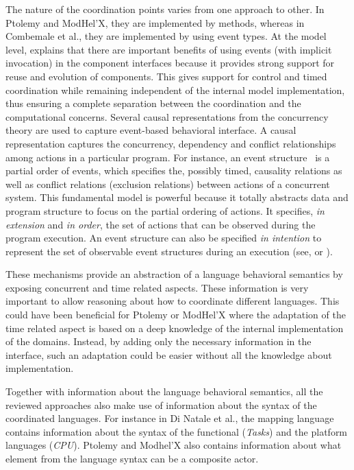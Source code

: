 {The nature of the coordination points varies from one approach to other. In Ptolemy and ModHel'X, they are implemented by methods, whereas in Combemale et al., they are implemented by using event types. At the model level, \cite{garlansoftarchbib} explains that there are important benefits of using events (with implicit invocation) in the component interfaces because it provides strong support for reuse and evolution of components. This gives support for control and timed coordination while remaining independent of the internal model implementation, thus ensuring a complete separation between the coordination and the computational concerns. Several causal representations from the concurrency theory are used to capture event-based behavioral interface. A causal representation captures the concurrency, dependency and conflict relationships among actions in a particular program. For instance, an event structure~\cite{eventStructures} is a partial order of events, which specifies the, possibly timed, causality relations as well as conflict relations (\ie exclusion relations) between actions of a concurrent system. This fundamental model is powerful because it totally abstracts data and program structure to focus on the partial ordering of actions. It specifies, \emph{in extension} and \emph{in order}, the set of actions that can be observed during the program execution. An event structure can also be specified \emph{in intention} to represent the set of observable event structures during an execution (see, \eg\cite{ccslbib} or \cite{tagmachinebib}). 

These mechanisms provide an abstraction of a language behavioral semantics by exposing concurrent and time related aspects. These information is very important to allow reasoning about how to coordinate different languages. This could have been beneficial for Ptolemy or ModHel'X where the adaptation of the time related aspect is based on a deep knowledge of the internal implementation of the domains. Instead, by adding only the necessary information in the interface, such an adaptation could be easier without all the knowledge about implementation. 

Together with information about the language behavioral semantics, all the reviewed approaches also make use of information about the syntax of the coordinated languages. For instance in Di Natale et al., the mapping language contains information about the syntax of the functional (\eg \emph{Tasks}) and the platform languages (\eg \emph{CPU}). Ptolemy and Modhel'X also contains information about what element from the language syntax can be a composite actor.

}
